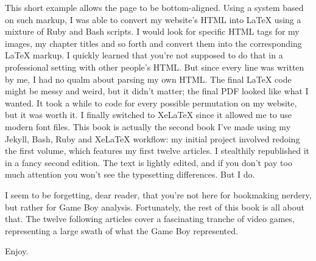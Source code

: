 \documentclass{book}
\begin{document}

This short example allows the page to be bottom-aligned. Using a system based on such markup, I was able to convert my website’s HTML into LaTeX using a mixture of Ruby and Bash scripts. I would look for specific HTML tags for my images, my chapter titles and so forth and convert them into the corresponding LaTeX markup. I quickly learned that you’re not supposed to do that in a professional setting with other people’s HTML. But since every line was written by me, I had no qualm about parsing my own HTML. The final LaTeX code might be messy and weird, but it didn’t matter; the final PDF looked like what I wanted. It took a while to code for every possible permutation on my website, but it was worth it. I finally switched to XeLaTeX since it allowed me to use modern font files. This book is actually the second book I’ve made using my Jekyll, Bash, Ruby and XeLaTeX workflow: my initial project involved redoing the first volume, which features my first twelve articles. I stealthily republished it in a fancy second edition. The text is lightly edited, and if you don’t pay too much attention you won’t see the typesetting differences. But I do.

I seem to be forgetting, dear reader, that you’re not here for bookmaking nerdery, but rather for Game Boy analysis. Fortunately, the rest of this book is all about that. The twelve following articles cover a fascinating tranche of video games, representing a large swath of what the Game Boy represented.

Enjoy.
\end{document}
